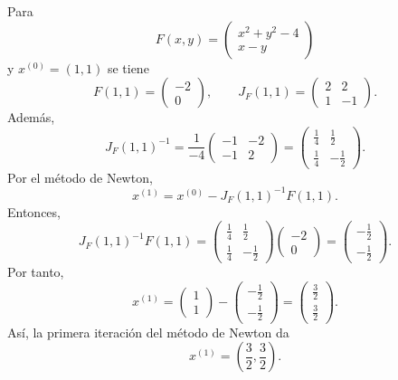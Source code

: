 \documentclass[a4,11pt]{aleph-notas}
\begin{document}
\begin{ejem}
    Para
    \[
        {F}(x,y)=
        \begin{pmatrix}
            x^2+y^2-4\\
            x-y
        \end{pmatrix}
    \]
    y ${x}^{(0)}=(1,1)$ se tiene
    \[
        {F}(1,1)=
        \begin{pmatrix}
            -2\\
            0
        \end{pmatrix},
        \qquad
        J_{{F}}(1,1)=
        \begin{pmatrix}
            2 & 2\\
            1 & -1
        \end{pmatrix}.
    \]
        Además,
    \[
        J_{{F}}(1,1)^{-1}
        =
        \frac{1}{-4}
        \begin{pmatrix}
            -1 & -2\\
            -1 & 2
        \end{pmatrix}
        =
        \begin{pmatrix}
            \frac{1}{4} & \frac{1}{2}\\
            \frac{1}{4} & -\frac{1}{2}
        \end{pmatrix}.
    \]
    Por el método de Newton,
    \[
        {x}^{(1)}
        =
        {x}^{(0)}-J_{{F}}(1,1)^{-1}{F}(1,1).
    \]
    Entonces,
    \[
        J_{{F}}(1,1)^{-1}{F}(1,1)
        =
        \begin{pmatrix}
            \frac{1}{4} & \frac{1}{2}\\
            \frac{1}{4} & -\frac{1}{2}
        \end{pmatrix}
        \begin{pmatrix}
            -2\\
            0
        \end{pmatrix}
        =
        \begin{pmatrix}
            -\frac{1}{2}\\
            -\frac{1}{2}
        \end{pmatrix}.
    \]
    Por tanto,
    \[
        {x}^{(1)}
        =
        \begin{pmatrix}
            1\\
            1
        \end{pmatrix}
        -
        \begin{pmatrix}
            -\frac{1}{2}\\
            -\frac{1}{2}
        \end{pmatrix}
        =
        \begin{pmatrix}
            \frac{3}{2}\\
            \frac{3}{2}
        \end{pmatrix}.
    \]
    Así, la primera iteración del método de Newton da
    \[
        {x}^{(1)}=\left(\frac{3}{2},\frac{3}{2}\right).
    \]
\end{ejem}
\end{document}
